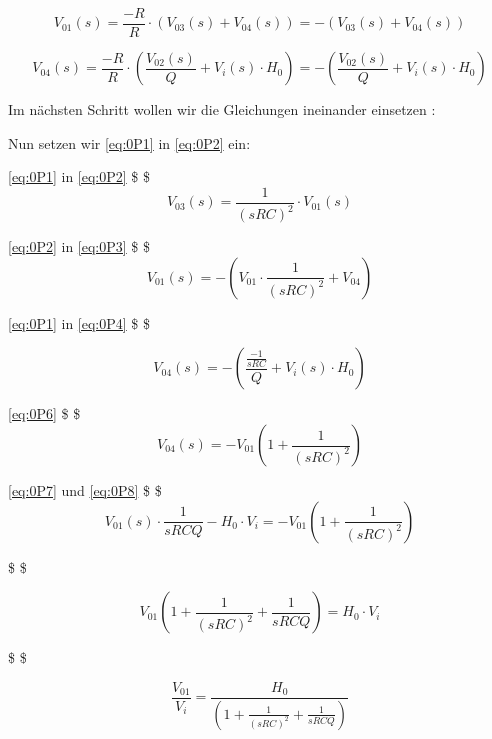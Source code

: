 \documentclass[
  ngerman,
  letterpaper,
  DIV=11]{scrreprt}
\begin{document}
\begin{equation}
V_{01}(s) = \frac{-R}{R} \cdot (V_{03}(s)+ V_{04}(s) ) = - (V_{03}(s)+ V_{04}(s) )
\label{eq:0P3}
\end{equation}

\begin{equation}
V_{04}(s) = \frac{-R}{R} \cdot ( \frac{V_{02}(s)}{Q} + V_{i}(s)\cdot H_{0} ) = - ( \frac{V_{02}(s)}{Q} + V_{i}(s)\cdot H_{0} )
\label{eq:0P4}
\end{equation}

Im nächsten Schritt wollen wir die Gleichungen ineinander einsetzen :

Nun setzen wir \eqref{eq:0P1} in \eqref{eq:0P2} ein:

\eqref{eq:0P1} in \eqref{eq:0P2} \$ \Rightarrow \$ \begin{equation}
V_{03}(s) = \frac{1}{(sRC)^2} \cdot V_{01}(s)
\label{eq:0P5}
\end{equation}

\eqref{eq:0P2} in \eqref{eq:0P3} \$ \Rightarrow \$ \begin{equation}
V_{01}(s) = - \left( V_{01}\cdot  \frac{1}{(sRC)^2} +  V_{04} \right) 
\label{eq:0P6}
\end{equation}

\eqref{eq:0P1} in \eqref{eq:0P4} \$ \Rightarrow \$

\begin{equation}
V_{04}(s) = -  ( \frac{\frac{-1}{sRC}}{Q} + V_{i}(s)\cdot H_{0} )
\label{eq:0P7}
\end{equation}

\eqref{eq:0P6} \$ \Rightarrow \$ \begin{equation}
V_{04}(s) = -V_{01} \left( 1 +  \frac{1}{(sRC)^2}  \right) 
\label{eq:0P8}
\end{equation}

\eqref{eq:0P7} und \eqref{eq:0P8} \$ \Rightarrow \$ \begin{equation}
V_{01}(s) \cdot \frac{1}{sRCQ} - H_{0}\cdot V_{i} = -V_{01} \left( 1 +  \frac{1}{(sRC)^2}  \right) 
\label{eq:0P9}
\end{equation}

\$ \Rightarrow \$

\begin{equation}
    V_{01} \left( 1 +  \frac{1}{(sRC)^2} + \frac{1}{sRCQ}  \right)  = H_{0}\cdot V_{i} 
\label{eq:0P9}
\end{equation}

\$ \Rightarrow \$

\begin{equation}
    \frac{V_{01}}{V_{i}} = \frac{H_{0}}{\left( 1 +  \frac{1}{(sRC)^2} + \frac{1}{sRCQ}  \right)  } 
\label{eq:0P10}
\end{equation}
\end{document}
